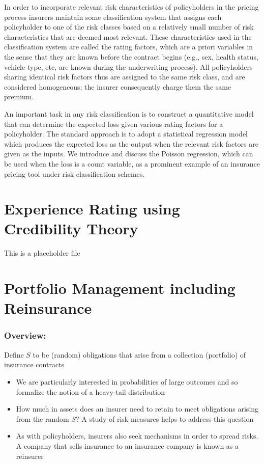 \documentclass[]{book}
\theoremstyle{definition}
\theoremstyle{definition}
\theoremstyle{definition}
\theoremstyle{remark}
\begin{document}
In order to incorporate relevant risk characteristics of policyholders
in the pricing process insurers maintain some classification system that
assigns each policyholder to one of the risk classes based on a
relatively small number of risk characteristics that are deemed most
relevant. These characteristics used in the classification system are
called the rating factors, which are a priori variables in the sense
that they are known before the contract begins (e.g., sex, health
status, vehicle type, etc, are known during the underwriting process).
All policyholders sharing identical risk factors thus are assigned to
the same risk class, and are considered homogeneous; the insurer
consequently charge them the same premium.

An important task in any risk classification is to construct a
quantitative model that can determine the expected loss given various
rating factors for a policyholder. The standard approach is to adopt a
statistical regression model which produces the expected loss as the
output when the relevant risk factors are given as the inputs. We
introduce and discuss the Poisson regression, which can be used when the
loss is a count variable, as a prominent example of an insurance pricing
tool under risk classification schemes.

\chapter{Experience Rating using Credibility
Theory}\label{C:Credibility}

This is a placeholder file

\chapter{Portfolio Management including Reinsurance}\label{C:PortMgt}

\subsection{Overview:}\label{overview}

Define \(S\) to be (random) obligations that arise from a collection
(portfolio) of insurance contracts

\begin{itemize}
\item
  We are particularly interested in probabilities of large outcomes and
  so formalize the notion of a heavy-tail distribution
\item
  How much in assets does an insurer need to retain to meet obligations
  arising from the random \(S\)? A study of risk measures helps to
  address this question
\item
  As with policyholders, insurers also seek mechanisms in order to
  spread risks. A company that sells insurance to an insurance company
  is known as a reinsurer
\end{itemize}
\end{document}
